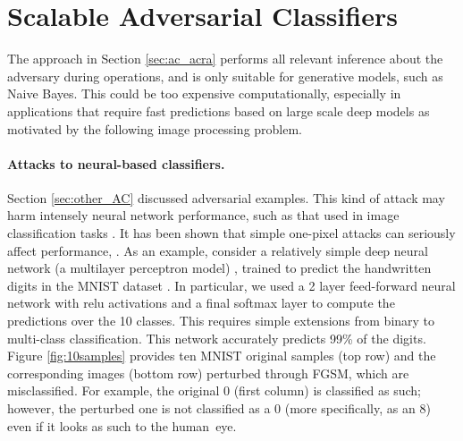 \section{Scalable Adversarial Classifiers}\label{sec:scalable}
%
The approach in Section \ref{sec:ac_acra} performs all relevant inference about the adversary during operations, and is only suitable for generative models, such as Naive Bayes. This could be too expensive computationally, especially in applications that require fast predictions
based on large scale deep models as motivated by the following image
processing problem.


\paragraph{Attacks to neural-based classifiers.}
Section \ref{sec:other_AC} discussed adversarial examples.  This kind of attack may harm intensely neural
network performance, such as that used in image classification tasks \cite{Szegedy14intriguingproperties}. It has been shown that simple one-pixel attacks can seriously affect performance, \cite{su2019one}.
As an example, consider 
a relatively simple deep neural network (a multilayer perceptron model) \cite{10.5555/3086952}, trained to predict the handwritten digits in the MNIST dataset \cite{MNIST}. In particular, we used a 2 layer feed-forward neural network with relu activations and a final softmax layer to compute the predictions over the 10 classes. This requires simple extensions from binary to multi-class classification. This network accurately predicts 99\% of the digits. Figure \ref{fig:10samples} provides ten MNIST original 
samples (top row) and the corresponding images (bottom row) perturbed through FGSM,
which are misclassified. For example, the original 0 
(first column) is classified
as such; however, the perturbed one
is not classified as a 0 (more specifically, as an 8) even if it looks as such to the human~eye.%



